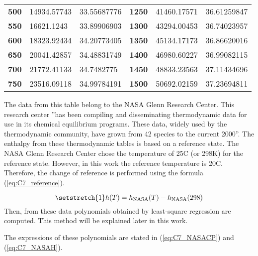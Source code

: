 \begin{longtable}[c]{@{}lll|lll@{}}
\textbf{500}                                      & 14934.57743         & 33.55687776            & \textbf{1250}                                   & 41460.17571         & 36.61259847            \\
\textbf{550}                                      & 16621.1243          & 33.89906903            & \textbf{1300}                                   & 43294.00453         & 36.74023957            \\
\textbf{600}                                      & 18323.92434         & 34.20773405            & \textbf{1350}                                   & 45134.17173         & 36.86620016            \\
\textbf{650}                                      & 20041.42857         & 34.48831749            & \textbf{1400}                                   & 46980.60227         & 36.99082115            \\
\textbf{700}                                      & 21772.41133         & 34.7482775             & \textbf{1450}                                   & 48833.23563         & 37.11434696            \\
\textbf{750}                                      & 23516.09118         & 34.99784191            & \textbf{1500}                                   & 50692.02159         & 37.23694811            \\* \bottomrule
\end{longtable}
The data from this table belong to the NASA Glenn Research Center. This research center ''has been compiling and disseminating thermodynamic data for use in its chemical equilibrium programs. These data, widely used by the thermodynamic community, have grown from 42 species to the current 2000''\cite{NASA}. The enthalpy from these thermodynamic tables is based on a reference state. The NASA Glenn Research Center chose the temperature of 25\degree C (or 298\degree K) for the reference state. 
However, in this work the reference temperature is 20\degree C. Therefore, the change of reference is performed using the formula (\ref{eq:C7_reference}).

\begin{equation}
\setstretch{1}
h(T) = h_\text{NASA}(T) - h_\text{NASA}(298)\label{eq:C7_reference}
\end{equation}
Then, from these data polynomials obtained by least-square regression are computed. This method will be explained later in this work.

The expressions of these polynomials are stated in (\ref{eq:C7_NASACP}) and (\ref{eq:C7_NASAH}).

